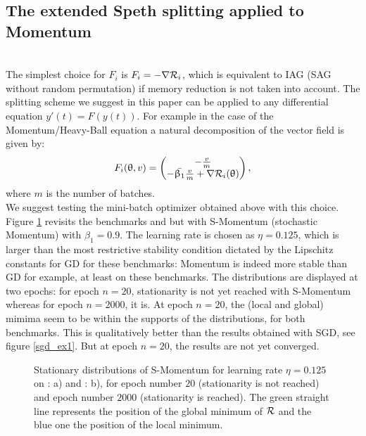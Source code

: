 \documentclass[article,authoryear,jmlmc]{beg_32}             %
\begin{document}
\subsection{The extended Speth splitting applied to Momentum}
\label{mom}
~~\\
The simplest choice for $F_i$ is $F_i=-\nabla \mathcal{R}_i$, which is equivalent to IAG (SAG without random permutation) if memory reduction is not taken into account. %
	The splitting scheme we suggest in this paper can be applied to any differential equation $y'(t)=F(y(t))$. For example in the case of the Momentum/Heavy-Ball equation \cite{momentum_sutskever_RNN,Polyak,polyak_momentum_stability,continuous_general} a natural decomposition of the vector field is given by:
	\begin{equation}
		F_i(\uptheta,v) = 
		\begin{pmatrix}
                  -\frac{v}{m} \\
                        -{\bar{\upbeta_1}}\frac{v}{m}+\nabla \mathcal{R}_i(\uptheta)
		\end{pmatrix},
	\label{vector_field_momentum}
	\end{equation}
        where $m$ is the number of batches.\\ 
        We suggest testing the mini-batch optimizer obtained above with this choice. Figure \ref{mom_ex1_ex2} revisits the benchmarks \exOne and \exTwo but with S-Momentum (stochastic Momentum) with $\beta_1=0.9$. 
        The learning rate is chosen as $\eta=0.125$, which is larger than the most restrictive stability condition dictated by the Lipschitz constants for GD for these benchmarks:
        Momentum is indeed more stable than GD for example, at least on these benchmarks. 
        The distributions are displayed at two epochs: for epoch $n=20$, stationarity is not yet reached with S-Momentum whereas for epoch $n=2000$, it is.  
        At epoch $n=20$, the (local and global) mimima seem to be within the supports of the distributions, for both benchmarks. This 
        is qualitatively better than the results obtained with SGD, see figure \ref{sgd_ex1}. 
        But at epoch $n=20$, the results are not yet converged.  
\begin{figure}[!h]
	\centering
        \scalebox{0.60}{}
	\scalebox{0.60}{}
        \caption{Stationary distributions of S-Momentum for learning rate $\eta=0.125$ on \exOne: a) and \exTwo: b), for epoch number $20$ (stationarity is not reached) and epoch number $2000$ (stationarity is reached). The green straight line represents the position of the global minimum of $\mathcal{R}$ and the blue one the position of the local minimum.}
	\label{mom_ex1_ex2}
\end{figure}
\end{document}
